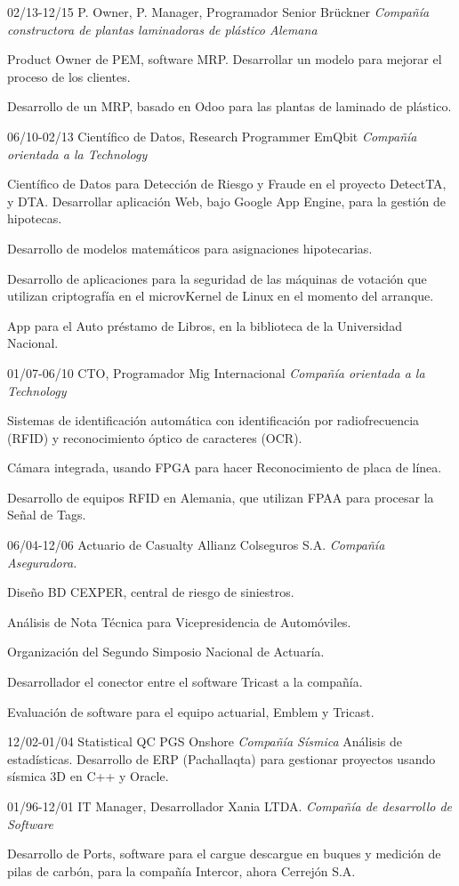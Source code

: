 \begin{entrylist}
  \entry
	{02/13-12/15}
	{P. Owner, P. Manager, Programador Senior}
	{Brückner {\sl Compañía constructora de plantas laminadoras de plástico Alemana}}
	{Product Owner de PEM, software MRP. Desarrollar un modelo para mejorar el proceso de los clientes.

	Desarrollo de un MRP, basado en Odoo para las plantas de laminado de plástico.}
  \entry
	{06/10-02/13}
	{Científico de Datos, Research Programmer}
	{EmQbit {\sl Compañía orientada a la Technology}}
	{Científico de Datos para Detección de Riesgo y Fraude en el proyecto DetectTA, y DTA.
Desarrollar aplicación Web, bajo Google App Engine, para la gestión de hipotecas.

Desarrollo de modelos matemáticos para asignaciones hipotecarias.

Desarrollo de aplicaciones para la seguridad de las máquinas de votación que utilizan criptografía
en el microvKernel de Linux en el momento del arranque.

App para el Auto préstamo de Libros, en la biblioteca de la Universidad Nacional.}

  \entry
	{01/07-06/10}
	{CTO, Programador}
	{Mig Internacional {\sl Compañía orientada a la Technology}}
	{Sistemas de identificación automática con identificación por radiofrecuencia (RFID)
y reconocimiento óptico de caracteres (OCR).

Cámara integrada, usando FPGA para hacer Reconocimiento de placa de línea.

Desarrollo de equipos RFID en Alemania, que utilizan FPAA para procesar la
Señal de Tags.}

  \entry
	{06/04-12/06}
	{Actuario de Casualty}
	{Allianz Colseguros S.A. {\sl Compañía Aseguradora.}}
	{Diseño BD CEXPER, central de riesgo de siniestros.

Análisis de Nota Técnica para Vicepresidencia de Automóviles.

Organización del Segundo Simposio Nacional de Actuaría.

Desarrollador el conector entre el software Tricast a la compañía.

Evaluación de software para el equipo actuarial, Emblem y Tricast.}


  \entry
	{12/02-01/04}
	{Statistical QC}
	{PGS Onshore {\sl Compañía Sísmica}}
	{Análisis de estadísticas. Desarrollo de ERP (Pachallaqta) para gestionar proyectos
	usando sísmica 3D en C++ y Oracle.}

  \entry
	{01/96-12/01}
	{IT Manager, Desarrollador}
	{Xania LTDA. {\sl Compañía de desarrollo de Software}}
	{Desarrollo de Ports, software para el cargue descargue en buques y medición de pilas de carbón,
	para la compañía Intercor, ahora Cerrejón S.A.

}
\end{entrylist}
